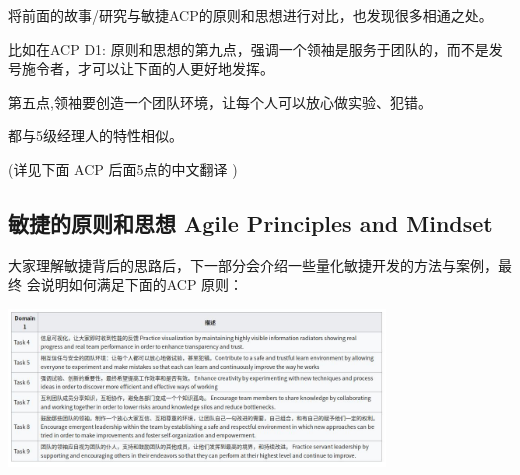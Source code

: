 将前面的故事/研究与敏捷ACP的原则和思想进行对比，也发现很多相通之处。

比如在ACP D1:
原则和思想的第九点，强调一个领袖是服务于团队的，而不是发号施令者，才可以让下面的人更好地发挥。

第五点,领袖要创造一个团队环境，让每个人可以放心做实验、犯错。

都与5级经理人的特性相似。

(详见下面 ACP 后面5点的中文翻译 )

\hypertarget{ux654fux6377ux7684ux539fux5219ux548cux601dux60f3-agile-principles-and-mindset}{%
\subsection{敏捷的原则和思想 Agile Principles and
Mindset}\label{ux654fux6377ux7684ux539fux5219ux548cux601dux60f3-agile-principles-and-mindset}}

大家理解敏捷背后的思路后，下一部分会介绍一些量化敏捷开发的方法与案例，最终
会说明如何满足下面的ACP 原则：

\includegraphics[width=10cm]{Screenshotfrom2022-01-23-1.jpg}

